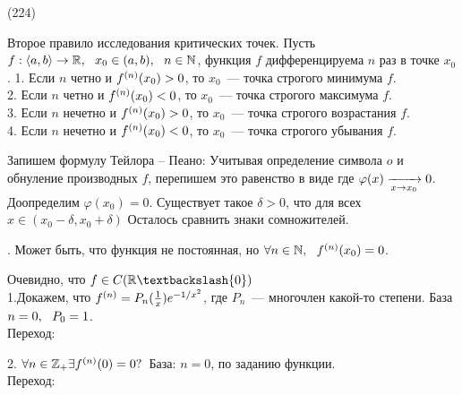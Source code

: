(224)

\T \q Второе правило исследования критических точек. Пусть $f: \langle a, b \rangle \to \mathbb{R},\ \  x_0\in(a, b),\ \  n \in \mathbb{N}$, функция $f$ дифференцируема $n$ раз в точке $x_0$. 
1. Если $n$ четно и $f^{(n)}(x_0) > 0$, то $x_0$~--- точка строгого минимума $f$.\\
2. Если $n$ четно и $f^{(n)}(x_0) < 0$, то $x_0$~--- точка строгого максимума $f$.\\
3. Если $n$ нечетно и $f^{(n)}(x_0) > 0$, то $x_0$~--- точка строгого возрастания $f$.\\
4. Если $n$ нечетно и $f^{(n)}(x_0) < 0$, то $x_0$~--- точка строгого убывания $f$.

\D Запишем формулу Тейлора -- Пеано:  Учитывая определение символа $o$ и обнуление производных $f$, перепишем это равенство в виде  где $\varphi(x) \xrightarrow[x \to x_0]{} 0$. Доопределим $\varphi(x_0) = 0$. Существует такое $\delta > 0$, что для всех $x \in (x_0 - \delta, x_0 + \delta)$  Осталось сравнить знаки сомножителей.

\Zam. Может быть, что функция не постоянная, но $\forall n \in \mathbb{N},\ \  f^{(n)}(x_0) = 0$.  

\D Очевидно, что $f \in C(\R \bsl\{0\})$\\
1.Докажем, что $f^{(n)} = P_n(\frac 1x)e^{-1/x^2}$, где $P_n$~--- многочлен какой-то степени. База $n = 0,\ \  P_0 = 1$.\\
Переход:  

2. $\forall n \in \mathbb{Z}_+ \exists f^{(n)}(0) = 0?$\
База: $n = 0$, по заданию функции.\\
Переход: 